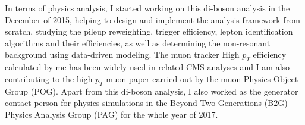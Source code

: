 \vspace{0.3cm}
In terms of physics analysis, I started working on this di-boson analysis in the December of 2015, helping to design and implement the analysis framework from scratch, studying the pileup reweighting, trigger efficiency, lepton identification algorithms and their efficiencies, as well as determining the non-resonant background using data-driven modeling. The muon tracker High $p_{T}$ efficiency calculated by me has been widely used in related CMS analyses and I am also contributing to the high $p_{T}$ muon paper carried out by the muon Physics Object Group (POG). Apart from this di-boson analysis, I also worked as the generator contact person for physics simulations in the Beyond Two Generations (B2G) Physics Analysis Group (PAG) for the whole year of 2017.
